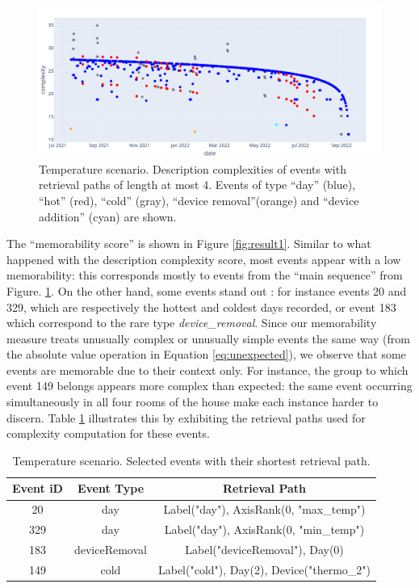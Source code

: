 \documentclass[entropy,article,submit,moreauthors,pdftex]{Definitions/mdpi}
\begin{document}
\begin{figure}[!ht]
    \centering
    \includegraphics[width=.9\linewidth]{figures/complexity_scenar_2.png}
    \caption{Temperature scenario. Description complexities of events with retrieval paths of
        length at most 4. Events of type ``day'' (blue), ``hot'' (red), ``cold''
        (gray), ``device removal''(orange) and ``device addition'' (cyan) are shown.}
    \label{fig:computed_cplx}
\end{figure}

The ``memorability score'' is shown in Figure \ref{fig:result1}. Similar to what happened with the description complexity score, most events appear with a low memorability: this corresponds mostly to events from the ``main sequence'' from Figure. \ref{fig:computed_cplx}. On the other hand, some events stand out : for instance events 20 and 329, which are respectively the hottest and coldest days recorded, or event 183 which correspond to the rare type \emph{device\_removal}.
Since our memorability measure treats unusually complex or unusually simple events the
same way (from the absolute value operation in Equation \ref{eq:unexpected}), we
observe that some events are memorable due to their context only. For instance,
the group to which event 149 belongs appears more complex than expected: the same event occurring simultaneously in all four rooms of the house make each instance harder to discern.
Table \ref{tab:paths} illustrates this by exhibiting the retrieval paths used for complexity computation for these events.

\begin{table}
    \centering
    \begin{tabular}{c|c|c}
        Event iD & Event Type    & Retrieval Path                             \\
        \hline
        20       & day           & Label("day"), AxisRank(0, "max\_temp")     \\
        329      & day           & Label("day"), AxisRank(0, "min\_temp")     \\
        183      & deviceRemoval & Label("deviceRemoval"), Day(0)             \\
        149      & cold          & Label("cold"), Day(2), Device("thermo\_2") \\
    \end{tabular}
    \caption{Temperature scenario. Selected events with their shortest retrieval path.}
    \label{tab:paths}
\end{table}
\end{document}
